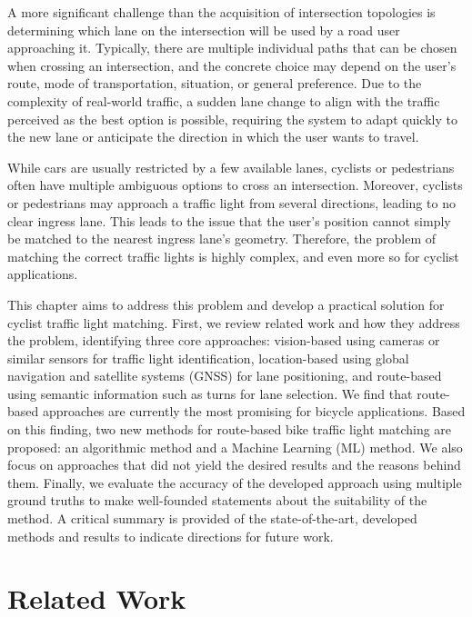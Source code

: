 A more significant challenge than the acquisition of intersection topologies is determining which lane on the intersection will be used by a road user approaching it. Typically, there are multiple individual paths that can be chosen when crossing an intersection, and the concrete choice may depend on the user's route, mode of transportation, situation, or general preference. Due to the complexity of real-world traffic, a sudden lane change to align with the traffic perceived as the best option is possible, requiring the system to adapt quickly to the new lane or anticipate the direction in which the user wants to travel. 

While cars are usually restricted by a few available lanes, cyclists or pedestrians often have multiple ambiguous options to cross an intersection. Moreover, cyclists or pedestrians may approach a traffic light from several directions, leading to no clear ingress lane. This leads to the issue that the user's position cannot simply be matched to the nearest ingress lane's geometry. Therefore, the problem of matching the correct traffic lights is highly complex, and even more so for cyclist applications.

This chapter aims to address this problem and develop a practical solution for cyclist traffic light matching. First, we review related work and how they address the problem, identifying three core approaches: vision-based using cameras or similar sensors for traffic light identification, location-based using global navigation and satellite systems (GNSS) for lane positioning, and route-based using semantic information such as turns for lane selection. We find that route-based approaches are currently the most promising for bicycle applications. Based on this finding, two new methods for route-based bike traffic light matching are proposed: an algorithmic method and a Machine Learning (ML) method. We also focus on approaches that did not yield the desired results and the reasons behind them. Finally, we evaluate the accuracy of the developed approach using multiple ground truths to make well-founded statements about the suitability of the method. A critical summary is provided of the state-of-the-art, developed methods and results to indicate directions for future work.

\section{Related Work}

